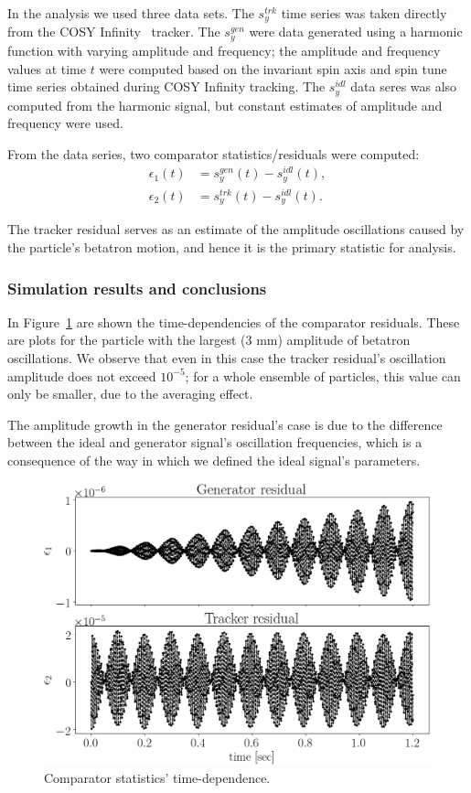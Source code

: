 \documentclass[]{elsarticle}
\begin{document}
In the analysis we used three data sets. The $s_y^{trk}$ time series was taken directly
from the COSY Infinity~\cite{COSYInf} tracker. The $s_y^{gen}$ were data generated using a harmonic function
with varying amplitude and frequency; the amplitude and frequency values at time $t$ were computed based
on the invariant spin axis and spin tune time series obtained during COSY Infinity tracking.
The $s_y^{idl}$ data seres was also computed from the harmonic signal, but constant estimates of
amplitude and frequency were used.

From the data series, two comparator statistics/residuals were computed:
\begin{align*}
  \epsilon_1(t) &= s_y^{gen}(t) - s_y^{idl}(t), \tag{generator residual}\\
  \epsilon_2(t) &= s_y^{trk}(t) - s_y^{idl}(t). \tag{tracker residual}
\end{align*}

The tracker residual serves as an estimate of the amplitude oscillations
caused by the particle's betatron motion, and hence it is the primary statistic for analysis.

\subsubsection{Simulation results and conclusions}

In Figure~\ref{fig:smp:resid_vs_time} are shown the time-dependencies of the comparator
residuals. These are plots for the particle with the largest (3 mm) amplitude of betatron oscillations.
We observe that even in this case the tracker residual's oscillation amplitude does not exceed
$10^{-5}$; for a whole ensemble of particles, this value can only be smaller, due to the averaging effect.

The amplitude growth in the generator residual's case is due to the difference between the ideal
and generator signal's oscillation frequencies, which is a consequence of the way in which we defined the
ideal signal's parameters.
\begin{figure}[h]
  \includegraphics[width=\linewidth]{img/smp_sim/residual_vs_time(both)}
  \caption{Comparator statistics' time-dependence.\label{fig:smp:resid_vs_time}}
\end{figure}
\end{document}
